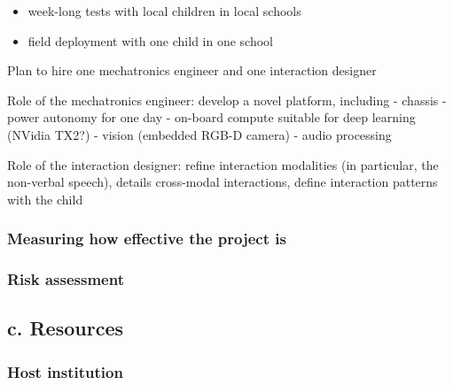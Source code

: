 \documentclass[]{article}
\begin{document}
\begin{itemize}
    \item week-long tests with local children in local schools
    \item field deployment with one child in one school
\end{itemize}


Plan to hire one mechatronics engineer and one interaction designer

Role of the mechatronics engineer: develop a novel platform, including -
chassis - power autonomy for one day - on-board compute suitable for
deep learning (NVidia TX2?) - vision (embedded RGB-D camera) - audio
processing

Role of the interaction designer: refine interaction modalities (in
particular, the non-verbal speech), details cross-modal interactions,
define interaction patterns with the child

\hypertarget{measuring-how-effective-the-project-is}{%
\subsubsection{Measuring how effective the project
is}\label{measuring-how-effective-the-project-is}}








\hypertarget{risk-assessment}{%
\subsubsection{Risk assessment}\label{risk-assessment}}

\hypertarget{c.-resources}{%
\subsection{c. Resources}\label{c.-resources}}

\hypertarget{host-institution}{%
\subsubsection{Host institution}\label{host-institution}}
\end{document}
